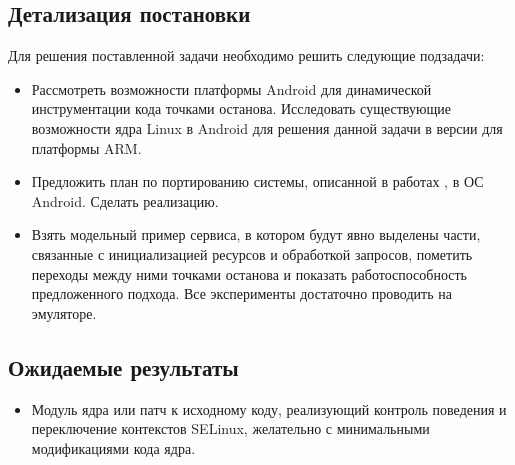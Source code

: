 \subsection{Детализация постановки}
Для решения поставленной задачи необходимо решить следующие подзадачи:
\begin{itemize}
\item Рассмотреть возможности платформы Android для динамической 
инструментации кода точками останова. Исследовать существующие
возможности ядра Linux в Android для решения данной задачи в версии для
платформы ARM.
\item Предложить план по портированию системы, описанной в
    работах \cite{sacharov} \cite{bush}, в ОС Android. Сделать
    реализацию.
\item Взять модельный пример сервиса, в котором будут явно выделены
    части, связанные с инициализацией ресурсов и обработкой запросов,
    пометить переходы между ними точками останова и показать
    работоспособность предложенного подхода. Все эксперименты достаточно
    проводить на эмуляторе.
\end{itemize}

\subsection{Ожидаемые результаты}
\begin{itemize}
\item Модуль ядра или патч к исходному коду, реализующий контроль
    поведения и переключение контекстов SELinux, желательно с
    минимальными модификациями кода ядра.
\end{itemize}
